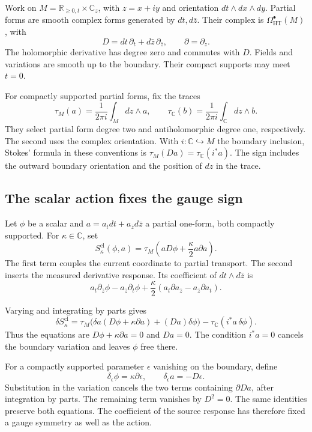 Work\label{pcsm:def:partial-forms} on \(M=\mathbb R_{\geq0,t}\times\mathbb C_z\),
with \(z=x+iy\) and orientation \(dt\wedge dx\wedge dy\).
Partial forms are smooth complex forms generated by \(dt,d\bar z\).
Their complex is \(\Omega_{\mathrm{HT}}^\bullet(M)\), with
\[
 D=dt\,\partial_t+d\bar z\,\partial_{\bar z},\qquad
 \partial=\partial_z.
\]
The holomorphic derivative has degree zero and commutes with \(D\).
Fields and variations are smooth up to the boundary.
Their compact supports may meet \(t=0\).

For compactly supported partial forms, fix the traces
\[
 \tau_M(a)=\frac1{2\pi i}\int_M dz\wedge a,
 \qquad
 \tau_{\mathbb C}(b)=\frac1{2\pi i}\int_{\mathbb C}dz\wedge b.
\]
They select partial form degree two and antiholomorphic degree one,
respectively. The second uses the complex orientation.
With\label{pcsm:def:boundary-inclusion} \(i:\mathbb C\hookrightarrow M\) the boundary inclusion,
Stokes' formula in these conventions is
\(\tau_M(Da)=\tau_{\mathbb C}(i^*a)\).
The sign includes the outward boundary orientation and the position
of \(dz\) in the trace.

\subsection{The scalar action fixes the gauge sign}

Let \(\phi\) be a scalar and
\(a=a_tdt+a_{\bar z}d\bar z\) a partial one-form, both compactly
supported. For \(\kappa\in\mathbb C\), set
\[
 S^{\mathrm{cl}}_\kappa(\phi,a)
 =\tau_M\left(aD\phi+\frac\kappa2a\partial a\right).
\]
The first term couples the current coordinate to partial transport.
The second inserts the measured derivative response.
Its coefficient of \(dt\wedge d\bar z\) is
\[
 a_t\partial_{\bar z}\phi-a_{\bar z}\partial_t\phi
 +\frac\kappa2(a_t\partial a_{\bar z}-a_{\bar z}\partial a_t).
\]

Varying and integrating by parts gives
\[
 \delta S^{\mathrm{cl}}_\kappa
 =\tau_M\bigl(\delta a(D\phi+\kappa\partial a)
                         +(Da)\delta\phi\bigr)
       -\tau_{\mathbb C}(i^*a\,\delta\phi).
\]
Thus the equations are \(D\phi+\kappa\partial a=0\) and \(Da=0\).
The condition \(i^*a=0\) cancels the boundary variation and leaves
\(\phi\) free there.

For\label{pcsm:def:scalar-gauge} a compactly supported parameter \(\epsilon\) vanishing on the
boundary, define
\[
 \delta_\epsilon\phi=\kappa\partial\epsilon,
 \qquad \delta_\epsilon a=-D\epsilon.
\]
Substitution in the variation cancels the two terms containing
\(\partial Da\), after integration by parts. The remaining term
vanishes by \(D^2=0\). The same identities preserve both equations.
The coefficient of the source response has therefore fixed a gauge
symmetry as well as the action.

